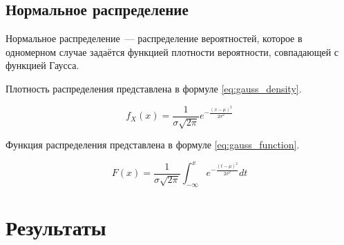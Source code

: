 \documentclass[a4paper, 12pt]{article}
\begin{document}
\subsection{Нормальное распределение}

Нормальное распределение~--- распределение вероятностей, которое в одномерном случае задаётся функцией плотности вероятности, совпадающей с функцией Гаусса.

Плотность распределения представлена в формуле \ref{eq:gauss_density}.

\begin{equation}\label{eq:gauss_density}
	f_X (x) = \frac{1}{\sigma \sqrt{2 \pi}} e^{-\frac{(x - \mu)^2}{2 \sigma^2}}
\end{equation}

Функция распределения представлена в формуле \ref{eq:gauss_function}.

\begin{equation}\label{eq:gauss_function}
	F (x) = \frac{1}{\sigma \sqrt{2\pi}} \int_{-\infty}^x e^{-\frac{(t- \mu)^2}{2 \sigma^2}} dt
\end{equation}

\section{{Результаты}}
\end{document}
